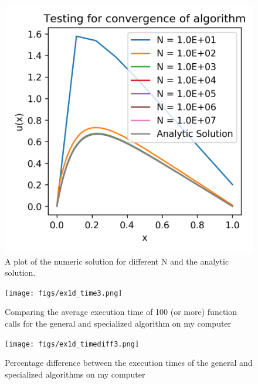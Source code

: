 \documentclass[10pt,showpacs,preprintnumbers,footinbib,amsmath,amssymb,aps,prl,twocolumn,groupedaddress,superscriptaddress,showkeys]{revtex4-1}
\begin{document}
  \begin{figure}[hbtp]
    \center
    \includegraphics[scale=.7]{figs/ex1c_compare.png}
    \caption{A plot of the numeric solution for different N and the analytic solution.}
  \end{figure}

  \begin{figure}[hbtp]
    \center
    \texttt{[image: figs/ex1d\_time3.png]}
    \caption{Comparing the average execution time of 100 (or more) function calls for the general and specialized algorithm on my computer}
  \end{figure}

  \begin{figure}[hbtp]
    \center
    \texttt{[image: figs/ex1d\_timediff3.png]}
    \caption{Percentage difference between the execution times of the general and specialized algorithms on my computer}
  \end{figure}
\end{document}
